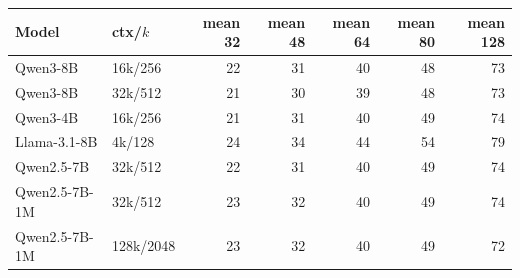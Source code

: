 \begin{tabular}{llrrrrr}
\toprule
Model & ctx/$k$ & mean 32 & mean 48 & mean 64 & mean 80 & mean 128 \\
\midrule
Qwen3-8B & 16k/256 & 22 & 31 & 40 & 48 & 73 \\
Qwen3-8B & 32k/512 & 21 & 30 & 39 & 48 & 73 \\
Qwen3-4B & 16k/256 & 21 & 31 & 40 & 49 & 74 \\
Llama-3.1-8B & 4k/128 & 24 & 34 & 44 & 54 & 79 \\
Qwen2.5-7B & 32k/512 & 22 & 31 & 40 & 49 & 74 \\
Qwen2.5-7B-1M & 32k/512 & 23 & 32 & 40 & 49 & 74 \\
Qwen2.5-7B-1M & 128k/2048 & 23 & 32 & 40 & 49 & 72 \\
\bottomrule
\end{tabular}